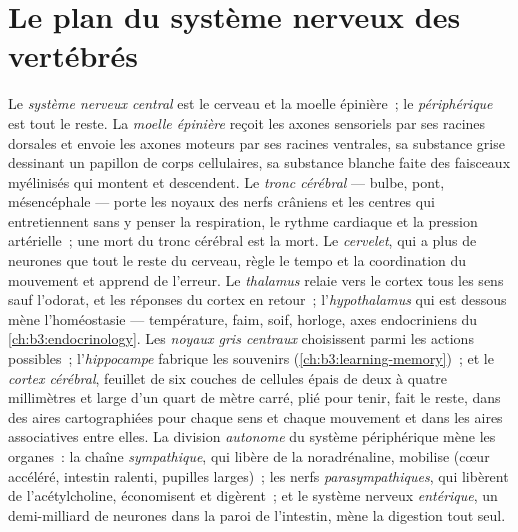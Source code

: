 \section{Le plan du système nerveux des vertébrés}

\begin{definition}\label{def:b3:nervous-systems:plan}
Le \emph{système nerveux central} est le cerveau et la moelle épinière~;
le \emph{périphérique} est tout le reste. La \emph{moelle épinière}
reçoit les axones sensoriels par ses racines dorsales et envoie les
axones moteurs par ses racines ventrales, sa substance grise dessinant
un papillon de corps cellulaires, sa substance blanche faite des
faisceaux myélinisés qui montent et descendent. Le \emph{tronc cérébral}
--- bulbe, pont, mésencéphale --- porte les noyaux des nerfs crâniens et
les centres qui entretiennent sans y penser la respiration, le rythme
cardiaque et la pression artérielle~; une mort du tronc cérébral est la
mort. Le \emph{cervelet}, qui a plus de neurones que tout le reste du
cerveau, règle le tempo et la coordination du mouvement et apprend de
l'erreur. Le \emph{thalamus} relaie vers le cortex tous les sens sauf
l'odorat, et les réponses du cortex en retour~; l'\emph{hypothalamus}
qui est dessous mène l'homéostasie --- température, faim, soif, horloge,
axes endocriniens du \cref{ch:b3:endocrinology}. Les \emph{noyaux gris
centraux} choisissent parmi les actions possibles~; l'\emph{hippocampe}
fabrique les souvenirs (\cref{ch:b3:learning-memory})~; et le
\emph{cortex cérébral}, feuillet de six couches de cellules épais de
deux à quatre millimètres et large d'un quart de mètre carré, plié pour
tenir, fait le reste, dans des aires cartographiées pour chaque sens et
chaque mouvement et dans les aires associatives entre elles. La division
\emph{autonome} du système périphérique mène les organes~: la chaîne
\emph{sympathique}, qui libère de la noradrénaline, mobilise (cœur
accéléré, intestin ralenti, pupilles larges)~; les nerfs
\emph{parasympathiques}, qui libèrent de l'acétylcholine, économisent et
digèrent~; et le système nerveux \emph{entérique}, un demi-milliard de
neurones dans la paroi de l'intestin, mène la digestion tout seul.
\end{definition}

